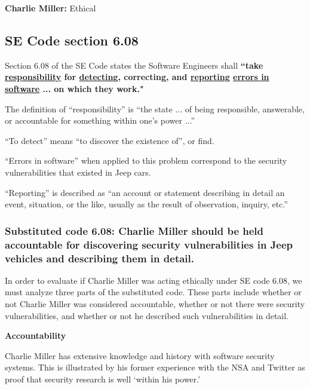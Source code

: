 \documentclass[12pt]{article}
\begin{document}
\begin{multicols}{2}
\begin{framed}
\hspace{-.67cm}\textbf{Charlie Miller:} Ethical
\end{framed}



\subsection{SE Code section 6.08}

Section 6.08 of the SE Code states the Software Engineers shall \textbf{``take \underline{responsibility} for \underline{detecting}, correcting, and \underline{reporting} \underline{errors in software} ... on which they work."}\cite{seCode}

The definition of ``responsibility'' is ``the state ... of being responsible, answerable, or accountable for something within one's power ...''\cite{dictionary}

``To detect'' means ``to discover the existence of''\cite{dictionary}, or find.

``Errors in software'' when applied to this problem correspond to the security vulnerabilities that existed in Jeep cars. 

``Reporting'' is described as ``an account or statement describing in detail an event, situation, or the like, usually as the result of observation, inquiry, etc.''\cite{dictionary}

\subsubsection{Substituted code 6.08: Charlie Miller should be held accountable for discovering security vulnerabilities in Jeep vehicles and describing them in detail.}

In order to evaluate if Charlie Miller was acting ethically under SE code 6.08, we must analyze three parts of the substituted code. These parts include whether or not Charlie Miller was considered accountable, whether or not there were security vulnerabilities, and whether or not he described such vulnerabilities in detail. 

\vspace{.5cm}\hspace{-.5cm}\textbf{Accountability}\vspace{.2cm}

Charlie Miller has extensive knowledge and history with software security systems. This is illustrated by his former experience with the NSA and Twitter\cite{linkedin} as proof that security research is well `within his power.' 


\end{multicols}
\end{document}
